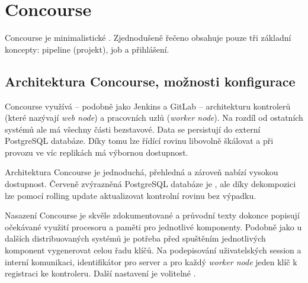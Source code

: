 \section{Concourse}
    Concourse je minimalistické \CI. Zjednodušeně řečeno obsahuje pouze tři základní koncepty: pipeline (projekt), job a přihlášení.

    \subsection{Architektura Concourse, možnosti konfigurace}
        Concourse využívá -- podobně jako Jenkins a GitLab -- architekturu kontrolerů (které nazývají \textit{web node}) a pracovních uzlů (\textit{worker node}). Na rozdíl od ostatních systémů ale má všechny části bezstavové. Data se persistují do externí PostgreSQL databáze. Díky tomu lze řídící rovinu libovolně škálovat a při provozu ve víc replikách má výbornou dostupnost.

        \begin{iffigure}
            \centering
            \caption{Architektura Concourse je jednoduchá, přehledná a zároveň nabízí vysokou dostupnost. Červeně zvýrazněná PostgreSQL databáze je , ale díky dekompozici lze pomocí rolling update aktualizovat kontrolní rovinu bez výpadku.}
            \label{pic:concourse-architecture}
        \end{iffigure}

        Nasazení Concourse je skvěle zdokumentované a průvodní texty dokonce popisují očekávané využití procesoru a paměti pro jednotlivé komponenty. Podobně jako u dalších distribuovaných systémů je potřeba před spuštěním jednotlivých komponent vygenerovat celou řadu klíčů. Na podepisování uživatelských session a interní komunikaci, identifikátor pro  server a pro každý \textit{worker node} jeden klíč k registraci ke kontroleru. Další nastavení je volitelné .

